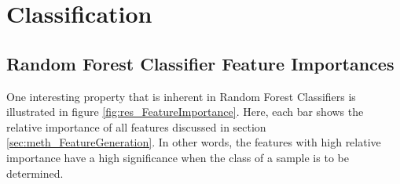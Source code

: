 \section{Classification} \label{sec:res_ModelPerformance}





\subsection{Random Forest Classifier Feature Importances}

One interesting property that is inherent in Random Forest Classifiers is illustrated in figure \ref{fig:res_FeatureImportance}. Here, each bar shows the relative importance of all features discussed in section \ref{sec:meth_FeatureGeneration}. In other words, the features with high relative importance have a high significance when the class of a sample is to be determined. 

